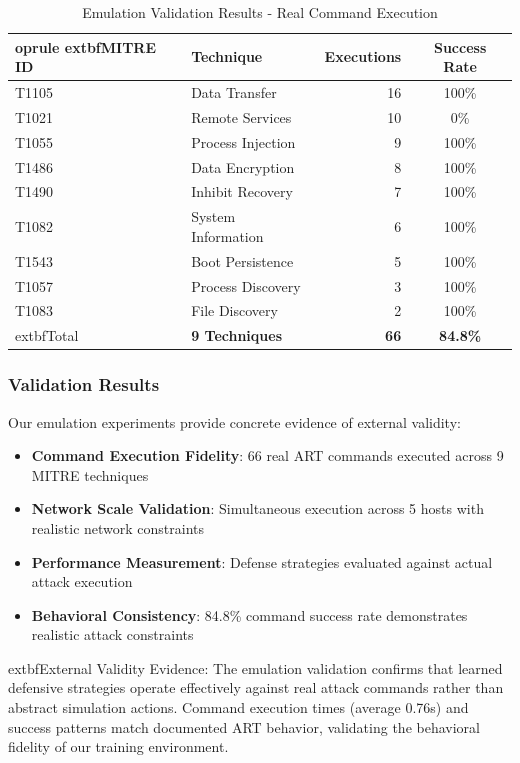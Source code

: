 \documentclass[12pt,twoside]{article}
\theoremstyle{definition}
\theoremstyle{plain}
\begin{document}
\begin{table}[H]
\centering
\caption{Emulation Validation Results - Real Command Execution}
\label{tab:emulation_validation}
\begin{tabular}{llrc}
	oprule
	extbf{MITRE ID} & \textbf{Technique} & \textbf{Executions} & \textbf{Success Rate} \\
\midrule
T1105 & Data Transfer & 16 & 100\% \\
T1021 & Remote Services & 10 & 0\% \\
T1055 & Process Injection & 9 & 100\% \\
T1486 & Data Encryption & 8 & 100\% \\
T1490 & Inhibit Recovery & 7 & 100\% \\
T1082 & System Information & 6 & 100\% \\
T1543 & Boot Persistence & 5 & 100\% \\
T1057 & Process Discovery & 3 & 100\% \\
T1083 & File Discovery & 2 & 100\% \\
\midrule
	extbf{Total} & \textbf{9 Techniques} & \textbf{66} & \textbf{84.8\%} \\
\bottomrule
\end{tabular}
\end{table}

\subsubsection{Validation Results}

Our emulation experiments provide concrete evidence of external validity:

\begin{itemize}
    \item \textbf{Command Execution Fidelity}: 66 real ART commands executed across 9 MITRE techniques
    \item \textbf{Network Scale Validation}: Simultaneous execution across 5 hosts with realistic network constraints
    \item \textbf{Performance Measurement}: Defense strategies evaluated against actual attack execution
    \item \textbf{Behavioral Consistency}: 84.8\% command success rate demonstrates realistic attack constraints
\end{itemize}

	extbf{External Validity Evidence}: The emulation validation confirms that learned defensive strategies operate effectively against real attack commands rather than abstract simulation actions. Command execution times (average 0.76s) and success patterns match documented ART behavior, validating the behavioral fidelity of our training environment.
\end{document}
